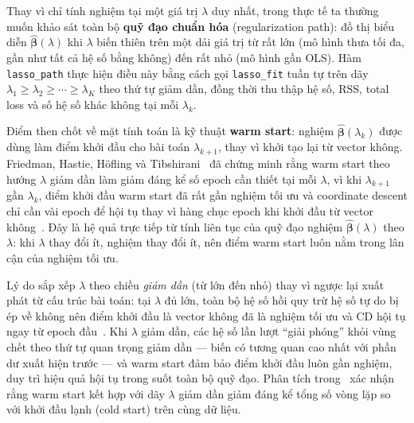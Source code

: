 
Thay vì chỉ tính nghiệm tại một giá trị $\lambda$ duy nhất, trong thực tế ta thường muốn
khảo sát toàn bộ \textbf{quỹ đạo chuẩn hóa} (regularization path): đồ thị biểu diễn
$\hat{\boldsymbol{\beta}}(\lambda)$ khi $\lambda$ biến thiên trên một dải giá trị từ rất
lớn (mô hình thưa tối đa, gần như tất cả hệ số bằng không) đến rất nhỏ (mô hình gần
OLS). Hàm \texttt{lasso\_path} thực hiện điều này bằng cách gọi \texttt{lasso\_fit}
tuần tự trên dãy $\lambda_1 \geq \lambda_2 \geq \cdots \geq \lambda_K$ theo thứ tự giảm
dần, đồng thời thu thập hệ số, RSS, total loss và số hệ số khác không tại mỗi $\lambda_k$.

Điểm then chốt về mặt tính toán là kỹ thuật \textbf{warm start}: nghiệm
$\hat{\boldsymbol{\beta}}(\lambda_k)$ được dùng làm điểm khởi đầu cho bài toán
$\lambda_{k+1}$, thay vì khởi tạo lại từ vector không. Friedman, Hastie, Höfling và
Tibshirani~\cite{friedman2007} đã chứng minh rằng warm start theo hướng $\lambda$ giảm
dần làm giảm đáng kể số epoch cần thiết tại mỗi $\lambda$, vì khi $\lambda_{k+1}$ gần
$\lambda_k$, điểm khởi đầu warm start đã rất gần nghiệm tối ưu và coordinate descent
chỉ cần vài epoch để hội tụ thay vì hàng chục epoch khi khởi đầu từ vector
không~\cite{friedman2007}. Đây là hệ quả trực tiếp từ tính liên tục của quỹ đạo nghiệm
$\hat{\boldsymbol{\beta}}(\lambda)$ theo $\lambda$: khi $\lambda$ thay đổi ít, nghiệm
thay đổi ít, nên điểm warm start luôn nằm trong lân cận của nghiệm tối ưu.

Lý do sắp xếp $\lambda$ theo chiều \textit{giảm dần} (từ lớn đến nhỏ) thay vì ngược lại
xuất phát từ cấu trúc bài toán: tại $\lambda$ đủ lớn, toàn bộ hệ số hồi quy trừ
hệ số tự do bị ép về không nên điểm khởi đầu là vector không đã là nghiệm tối ưu và CD
hội tụ ngay từ epoch đầu~\cite{friedman2010}. Khi $\lambda$ giảm dần, các hệ số lần lượt
``giải phóng'' khỏi vùng chết theo thứ tự quan trọng giảm dần --- biến có tương quan cao
nhất với phần dư xuất hiện trước --- và warm start đảm bảo điểm khởi đầu luôn gần nghiệm,
duy trì hiệu quả hội tụ trong suốt toàn bộ quỹ đạo. Phân tích trong~\cite{friedman2007}
xác nhận rằng warm start kết hợp với dãy $\lambda$ giảm dần giảm đáng kể tổng số vòng
lặp so với khởi đầu lạnh (cold start) trên cùng dữ liệu.


